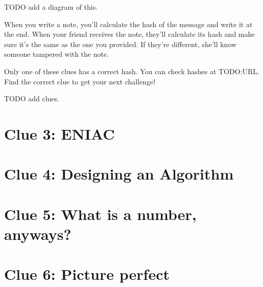 \documentclass{article}
\begin{document}
TODO add a diagram of this.

When you write a note, you'll calculate the hash of the message and write it at the end. When your friend receives the note, they'll calculate its hash and make sure it's the same as the one you provided. If they're different, she'll know someone tampered with the note.

Only one of these clues has a correct hash. You can check hashes at TODO:URL. Find the correct clue to get your next challenge!

TODO add clues.

\newpage

\section*{Clue 3: ENIAC}

\newpage

\section*{Clue 4: Designing an Algorithm}
\newpage

\section*{Clue 5: What is a number, anyways?}
\newpage

\section*{Clue 6: Picture perfect}
\end{document}
